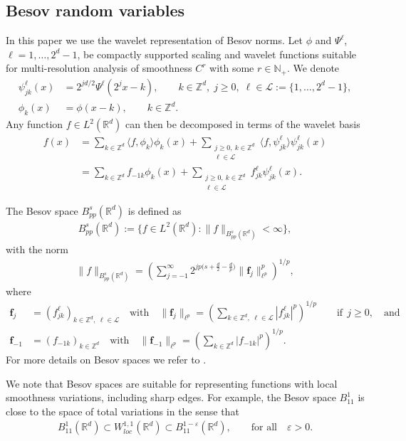 \documentclass[11pt,a4paper]{article}
\newcommand{\kauno}{{\mathcal L}}
\newcommand{\N}{\mathbb{N}}
\newcommand{\R}{\mathbb{R}}
\newcommand{\Z}{\mathbb{Z}}
\begin{document}
\subsection{Besov random variables}\label{Sec:BesovMeasures}
In this paper we use the wavelet representation of Besov norms. 
Let $\phi$ and $\Psi^\ell$, $\ell=1,\ldots ,2^d-1$, be compactly supported scaling and wavelet functions suitable for multi-resolution analysis of smoothness $C^r$ with some $r\in\N_+$. We denote
\begin{align*}
\psi^\ell_{jk}(x)&=2^{jd/2}\Psi^\ell(2^jx-k),\qquad k\in\Z^d,\;  
j\geq 0,  \; \ell\in\kauno:=\{1,\ldots, 2^d-1\},\\
\phi_{k}(x)&= \phi(x-k), \qquad k\in \Z^d.
\end{align*}
Any function $f\in L^2(\R^d)$ can then be decomposed in terms of the wavelet basis
\begin{align*}
f(x)&=\sum_{k\in\Z^d}\langle f, \phi_k\rangle\phi_k(x)
+\sum_{\substack{j\geq 0,\ k\in \Z^d\\ \ell\in\kauno}}\langle f, \psi^\ell_{ jk}\rangle\psi^\ell_{ jk}(x)\\
&=\sum_{k\in\Z^d}f_{-1k}\phi_k(x)+\sum_{\substack{j\geq 0,\ k\in \Z^d
\\ \ell\in\kauno}}f^\ell_{ jk}\psi^\ell_{ jk}(x).
\end{align*}

The Besov space $B_{pp}^s(\R^d)$ is defined as
\begin{align*}
    B_{pp}^s(\R^d):= \{f\in L^2(\R^d): \|f\|_{B^s_{pp}(\R^d)}<\infty \},
\end{align*}
with the norm
\begin{align*}
\|f\|_{B^s_{pp}(\R^d)}
= \left(\sum_{{j=-1}}^\infty 2^{jp\big(s+\frac d2-\frac dp\big)}
\|\textbf{f}_j\|_{\ell^p}^p\right)^{1/p},
\end{align*}
where
\begin{align*}
\textbf{f}_j&=(f^\ell_{ jk})_{k\in \Z^d, \; \ell\in\kauno}\quad \text{with}\quad
\|\textbf{f}_j\|_{\ell^p}=\left(\sum_{k\in \Z^d, \; \ell\in\kauno}
|f^\ell_{ jk}|^p\right)^{1/p}  \qquad \textrm {if}\;\, j\geq 0,\quad \textrm{and}\\
\textbf{f}_{-1}&=(f_{-1k})_{k\in \Z^d} \quad \text{with}\quad
\|\textbf{f}_{-1}\|_{\ell^p}=\left(\sum_{k\in \Z^d}|f_{-1k}|^p\right)^{1/p}.
\end{align*}
For more details on Besov spaces we refer to 
\cite{Adams1975,Gine2015,Tartar2007}.

We note that Besov spaces are suitable for representing functions with local smoothness variations, including sharp edges. For example, the Besov space $B^1_{11}$ is close to the space of total variations in the sense that 
\begin{align*}
    B^{1}_{11}(\R^d)\subset W^{1,1}_{loc}(\R^d)\subset B^{1-\varepsilon}_{11}(\R^d), \qquad \textrm{for all}\quad \varepsilon >0.
\end{align*}
\end{document}

